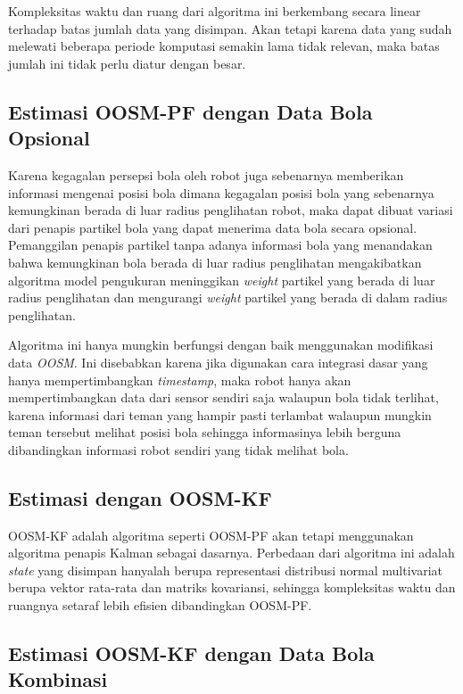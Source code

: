 Kompleksitas waktu dan ruang dari algoritma ini berkembang secara linear terhadap batas jumlah data yang disimpan. Akan tetapi karena data yang sudah melewati beberapa periode komputasi semakin lama tidak relevan, maka batas jumlah ini tidak perlu diatur dengan besar.

\subsection{Estimasi OOSM-PF dengan Data Bola Opsional}

Karena kegagalan persepsi bola oleh robot juga sebenarnya memberikan informasi mengenai posisi bola dimana kegagalan posisi bola yang sebenarnya kemungkinan berada di luar radius penglihatan robot, maka dapat dibuat variasi dari penapis partikel bola yang dapat menerima data bola secara opsional. Pemanggilan penapis partikel tanpa adanya informasi bola yang menandakan bahwa kemungkinan bola berada di luar radius penglihatan mengakibatkan algoritma model pengukuran meninggikan \textit{weight} partikel yang berada di luar radius penglihatan dan mengurangi \textit{weight} partikel yang berada di dalam radius penglihatan.

Algoritma ini hanya mungkin berfungsi dengan baik menggunakan modifikasi data \textit{OOSM}. Ini disebabkan karena jika digunakan cara integrasi dasar yang hanya mempertimbangkan \textit{timestamp}, maka robot hanya akan mempertimbangkan data dari sensor sendiri saja walaupun bola tidak terlihat, karena informasi dari teman yang hampir pasti terlambat walaupun mungkin teman tersebut melihat posisi bola sehingga informasinya lebih berguna dibandingkan informasi robot sendiri yang tidak melihat bola.

\subsection{Estimasi dengan OOSM-KF}

OOSM-KF adalah algoritma seperti OOSM-PF akan tetapi menggunakan algoritma penapis Kalman sebagai dasarnya. Perbedaan dari algoritma ini adalah \textit{state} yang disimpan hanyalah berupa representasi distribusi normal multivariat berupa vektor rata-rata dan matriks kovariansi, sehingga kompleksitas waktu dan ruangnya setaraf lebih efisien dibandingkan OOSM-PF.

\subsection{Estimasi OOSM-KF dengan Data Bola Kombinasi}

